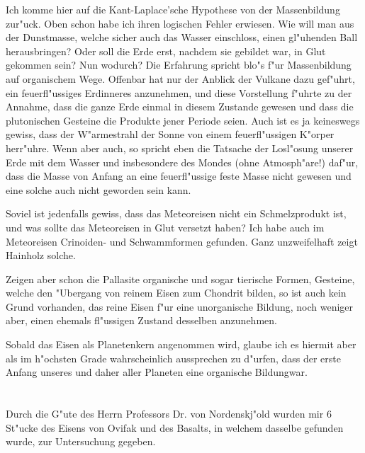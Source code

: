 \documentclass[a4paper, 11pt, oneside]{article}
\begin{document}
Ich komme hier auf die Kant-Laplace'sche Hypothese von der Massenbildung zur"uck. Oben schon habe ich ihren logischen Fehler erwiesen. Wie will man aus der Dunstmasse, welche sicher auch das Wasser einschloss, einen gl"uhenden Ball herausbringen? Oder soll die Erde erst, nachdem sie gebildet war, in Glut gekommen sein? Nun wodurch? Die Erfahrung spricht blo"s f"ur Massenbildung auf organischem Wege. Offenbar hat nur der Anblick der Vulkane dazu gef"uhrt, ein feuerfl"ussiges Erdinneres anzunehmen, und diese Vorstellung f"uhrte zu der Annahme, dass die ganze Erde einmal in diesem Zustande gewesen und dass die plutonischen Gesteine die Produkte jener Periode seien. Auch ist es ja keineswegs gewiss, dass der W"armestrahl der Sonne von einem feuerfl"ussigen K"orper herr"uhre. Wenn aber auch, so spricht eben die Tatsache der Losl"osung unserer Erde mit dem Wasser und insbesondere des Mondes (ohne Atmosph"are!) daf"ur, dass die Masse von Anfang an eine feuerfl"ussige feste Masse nicht gewesen und eine solche auch nicht geworden sein kann.

Soviel ist jedenfalls gewiss, dass das Meteoreisen nicht ein Schmelzprodukt ist, und was sollte das Meteoreisen in Glut versetzt haben? Ich habe auch im Meteoreisen Crinoiden- und Schwammformen gefunden. Ganz unzweifelhaft zeigt Hainholz solche.

Zeigen aber schon die Pallasite organische und sogar tierische Formen, Gesteine, welche den "Ubergang von reinem Eisen zum Chondrit bilden, so ist auch kein Grund vorhanden, das reine Eisen f"ur eine unorganische Bildung, noch weniger aber, einen ehemals fl"ussigen Zustand desselben anzunehmen.

Sobald das Eisen als Planetenkern angenommen wird, glaube ich es hiermit aber als im h"ochsten Grade wahrscheinlich aussprechen zu d"urfen, dass der erste Anfang unseres und daher aller Planeten eine organische Bildungwar.
\clearpage
\section{}
\paragraph{}
Durch die G"ute des Herrn Professors Dr. von Nordenskj"old wurden mir 6 St"ucke des Eisens von Ovifak und des Basalts, in welchem dasselbe gefunden wurde, zur Untersuchung gegeben.
\end{document}
